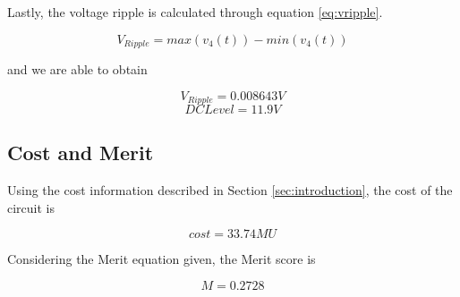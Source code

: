 \clearpage


Lastly, the voltage ripple is calculated through equation \ref{eq:vripple}.

\begin{equation}
    V_{Ripple} = max(v_4(t)) - min(v_4(t))
    \label{eq:vripple}
\end{equation}

and we are able to obtain 

\begin{equation}
    V_{Ripple} = 0.008643 V
\end{equation}
\begin{equation}
    DC Level = 11.9 V
\end{equation}

\subsection{Cost and Merit}
\label{subsec:theo_merit}

Using the cost information described in Section \ref{sec:introduction}, the cost of the circuit is

\begin{equation}
    cost = 33.74 MU
\end{equation}

Considering the Merit equation given, the Merit score is

\begin{equation}
    M = 0.2728
\end{equation}
